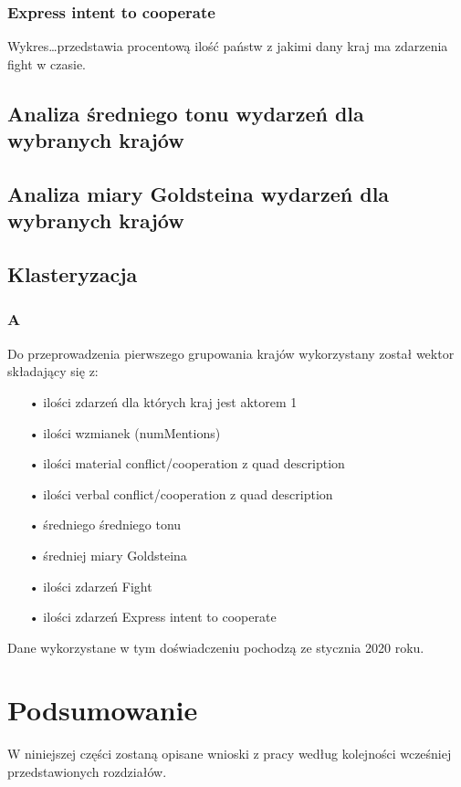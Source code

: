 \documentclass[11pt]{report}
\begin{document}
    \subsection{Express intent to cooperate}

    Wykres\ldots przedstawia procentową ilość państw z jakimi dany kraj ma zdarzenia fight w czasie.


    \section{Analiza średniego tonu wydarzeń dla wybranych krajów}


    \section{Analiza miary Goldsteina wydarzeń dla wybranych krajów}


    \section{Klasteryzacja}

    \subsection{A}

    Do przeprowadzenia pierwszego grupowania krajów wykorzystany został wektor składający się z:
    \begin{enumerate}
        \item[•] ilości zdarzeń dla których kraj jest aktorem 1
        \item[•] ilości wzmianek (numMentions)
        \item[•] ilości material conflict/cooperation z quad description
        \item[•] ilości verbal conflict/cooperation z quad description
        \item[•] średniego średniego tonu
        \item[•] średniej miary Goldsteina
        \item[•] ilości zdarzeń Fight
        \item[•] ilości zdarzeń Express intent to cooperate
    \end{enumerate}
    Dane wykorzystane w tym doświadczeniu pochodzą ze stycznia 2020 roku.


    \chapter{Podsumowanie}
    W niniejszej części zostaną opisane wnioski z pracy według kolejności wcześniej przedstawionych rozdziałów.
\end{document}
